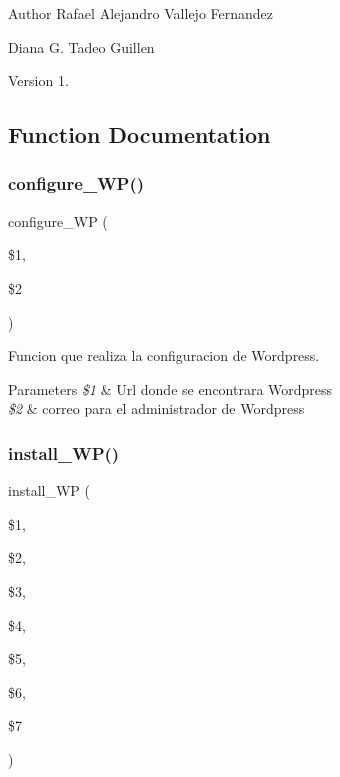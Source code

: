\begin{DoxyAuthor}{Author}
Rafael Alejandro Vallejo Fernandez 

Diana G. Tadeo Guillen 
\end{DoxyAuthor}
\begin{DoxyVersion}{Version}
1. 
\end{DoxyVersion}


\subsection{Function Documentation}
\mbox{\label{WP__Instalador__General_8sh_add91f549a7f408a6c51455ab9982ef5e}} 
\subsubsection{\texorpdfstring{configure\+\_\+\+W\+P()}{configure\_WP()}}
{\footnotesize\ttfamily configure\+\_\+\+WP (\begin{DoxyParamCaption}\item[{}]{\$1,  }\item[{}]{\$2 }\end{DoxyParamCaption})}



Funcion que realiza la configuracion de Wordpress. 


\begin{DoxyParams}{Parameters}
{\em \$1} & Url donde se encontrara Wordpress \\
\hline
{\em \$2} & correo para el administrador de Wordpress \\
\hline
\end{DoxyParams}
\mbox{\label{WP__Instalador__General_8sh_ab8bd4095cd5a5c54fa9256d3064f6d0f}} 
\subsubsection{\texorpdfstring{install\+\_\+\+W\+P()}{install\_WP()}}
{\footnotesize\ttfamily install\+\_\+\+WP (\begin{DoxyParamCaption}\item[{}]{\$1,  }\item[{}]{\$2,  }\item[{}]{\$3,  }\item[{}]{\$4,  }\item[{}]{\$5,  }\item[{}]{\$6,  }\item[{}]{\$7 }\end{DoxyParamCaption})}



